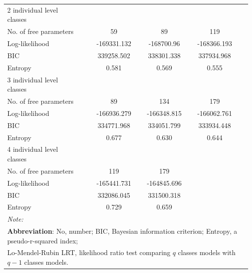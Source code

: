 \begin{table}[H]
\begin{tabular}[t]{lccccc}
		\hspace{1em}2 individual level classes &  &  &  &  & \\
		\hspace{1em}\hspace{1em}No. of free parameters &  & 59 & 89 & 119 & \\
		\hspace{1em}\hspace{1em}Log-likelihood &  & -169331.132 & -168700.96 & -168366.193 & \\
		\hspace{1em}\hspace{1em}BIC &  & 339258.502 & 338301.338 & 337934.968 & \\
		\hspace{1em}\hspace{1em}Entropy &  & 0.581 & 0.569 & 0.555 & \\
		\hspace{1em}3 individual level classes &  &  &  &  & \\
		\hspace{1em}\hspace{1em}No. of free parameters &  & 89 & 134 & 179 & \\
		\hspace{1em}\hspace{1em}Log-likelihood &  & -166936.279 & -166348.815 & -166062.761 & \\
		\hspace{1em}\hspace{1em}BIC &  & 334771.968 & 334051.799 & 333934.448 & \\
		\hspace{1em}\hspace{1em}Entropy &  & 0.677 & 0.630 & 0.644 & \\
		\hspace{1em}4 individual level classes &  &  &  &  & \\
		\hspace{1em}\hspace{1em}No. of free parameters &  & 119 & 179 &  & \\
		\hspace{1em}\hspace{1em}Log-likelihood &  & -165441.731 & -164845.696 &  & \\
		\hspace{1em}\hspace{1em}BIC &  & 332086.045 & 331500.318 &  & \\
		\hspace{1em}\hspace{1em}Entropy &  & 0.729 & 0.659 &  & \\
		\bottomrule
		\multicolumn{6}{l}{\textit{Note: }}\\
		\multicolumn{6}{l}{\textbf{Abbreviation}: No, number; BIC, Bayesian information criterion; Entropy, a pseudo-r-squared index;}\\ 
		\multicolumn{6}{l}{Lo-Mendel-Rubin LRT, likelihood ratio test comparing $q$ classes models with $q-1$ classes models.}\\
	\end{tabular}
\end{table}

